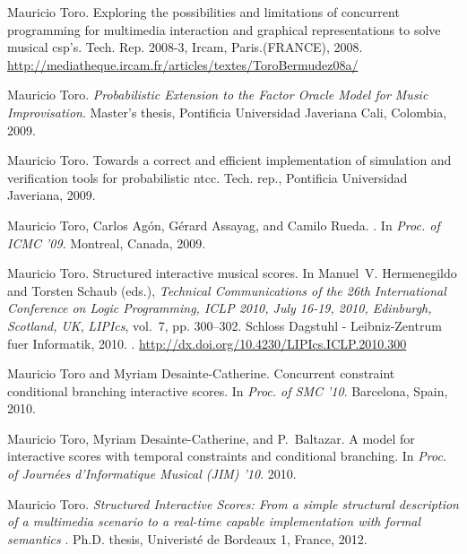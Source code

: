\documentclass[]{lipics-iclp}
\theoremstyle{plain}\newtheorem{mainthm}[thm]{Main Theorem}
\theoremstyle{definition}\newtheorem{crucialdef}[thm]{Crucial Definition}
\begin{document}
\begin{thebibliography}{{Tor}16a}
Mauricio Toro.
\newblock Exploring the possibilities and limitations of concurrent programming
  for multimedia interaction and graphical representations to solve musical
  csp's.
\newblock Tech. Rep. 2008-3, Ircam, Paris.{(FRANCE)}, 2008.
\newline\urlprefix\url{http://mediatheque.ircam.fr/articles/textes/ToroBermudez08a/}

Mauricio Toro.
\newblock \emph{{Probabilistic Extension to the Factor Oracle Model for Music
  Improvisation}}.
\newblock Master's thesis, Pontificia Universidad Javeriana Cali, Colombia,
  2009.

Mauricio Toro.
\newblock Towards a correct and efficient implementation of simulation and
  verification tools for probabilistic ntcc.
\newblock Tech. rep., Pontificia Universidad Javeriana, 2009.

Mauricio Toro, Carlos Ag{\'o}n, G{\'e}rard Assayag, and Camilo Rueda.
.
\newblock In \emph{{Proc. of ICMC '09}}. Montreal, Canada, 2009.

Mauricio Toro.
\newblock Structured interactive musical scores.
\newblock In Manuel~V. Hermenegildo and Torsten Schaub (eds.), \emph{Technical
  Communications of the 26th International Conference on Logic Programming,
  {ICLP} 2010, July 16-19, 2010, Edinburgh, Scotland, {UK}}, \emph{LIPIcs},
  vol.~7, pp. 300--302. Schloss Dagstuhl - Leibniz-Zentrum fuer Informatik,
  2010.
\newblock {}.
\newline\urlprefix\url{http://dx.doi.org/10.4230/LIPIcs.ICLP.2010.300}

Mauricio Toro and Myriam Desainte-Catherine.
\newblock Concurrent constraint conditional branching interactive scores.
\newblock In \emph{Proc. of SMC '10}. Barcelona, Spain, 2010.

Mauricio Toro, Myriam Desainte-Catherine, and P.~Baltazar.
\newblock A model for interactive scores with temporal constraints and
  conditional branching.
\newblock In \emph{Proc. of Journ{\'e}es d'Informatique Musical (JIM) '10}.
  2010.

Mauricio Toro.
\newblock \emph{{Structured Interactive Scores: From a simple structural
  description of a multimedia scenario to a real-time capable implementation
  with formal semantics }}.
\newblock Ph.D. thesis, Univerist{\'e} de Bordeaux 1, France, 2012.


\end{thebibliography}
\end{document}
